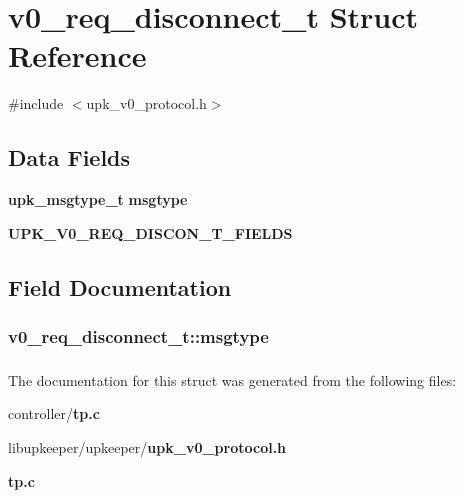 \section{v0\_\-req\_\-disconnect\_\-t Struct Reference}
\label{structv0__req__disconnect__t}


{\ttfamily \#include $<$upk\_\-v0\_\-protocol.h$>$}

\subsection*{Data Fields}
\begin{DoxyCompactItemize}
\item 
{\bf upk\_\-msgtype\_\-t} {\bf msgtype}
\item 
{\bf UPK\_\-V0\_\-REQ\_\-DISCON\_\-T\_\-FIELDS}
\end{DoxyCompactItemize}


\subsection{Field Documentation}
\subsubsection[{msgtype}]{ {\bf v0\_\-req\_\-disconnect\_\-t::msgtype}}\label{structv0__req__disconnect__t_a862538fef8514075e74f54f5f124fb11}
\subsubsection[{UPK\_\-V0\_\-REQ\_\-DISCON\_\-T\_\-FIELDS}]{}\label{structv0__req__disconnect__t_a5adf5ebd9a9d41566f01196da98fe1cd}


The documentation for this struct was generated from the following files:\begin{DoxyCompactItemize}
\item 
controller/{\bf tp.c}\item 
libupkeeper/upkeeper/{\bf upk\_\-v0\_\-protocol.h}\item 
{\bf tp.c}\end{DoxyCompactItemize}
